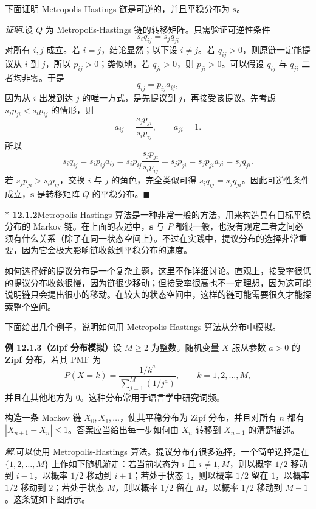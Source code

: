 \documentclass[UTF8,12pt,a4paper,fontset=fandol]{ctexart}
\newcommand{\biohazard}{\ensuremath{\ast}}
\begin{document}
下面证明 Metropolis-Hastings 链是可逆的，并且平稳分布为 $\mathbf s$。

\noindent\textit{证明.}\quad 设 $Q$ 为 Metropolis-Hastings 链的转移矩阵。只需验证可逆性条件
\[
  s_iq_{ij}=s_jq_{ji}
\]
对所有 $i,j$ 成立。若 $i=j$，结论显然；以下设 $i\ne j$。若 $q_{ij}>0$，则原链一定能提议从 $i$ 到 $j$，所以 $p_{ij}>0$；类似地，若 $q_{ji}>0$，则 $p_{ji}>0$。可以假设 $q_{ij}$ 与 $q_{ji}$ 二者均非零。于是
\[
  q_{ij}=p_{ij}a_{ij},
\]
因为从 $i$ 出发到达 $j$ 的唯一方式，是先提议到 $j$，再接受该提议。先考虑 $s_jp_{ji}<s_ip_{ij}$ 的情形，则
\[
  a_{ij}=\frac{s_jp_{ji}}{s_ip_{ij}},\qquad a_{ji}=1.
\]
所以
\[
  s_iq_{ij}
  =s_ip_{ij}a_{ij}
  =s_ip_{ij}\frac{s_jp_{ji}}{s_ip_{ij}}
  =s_jp_{ji}
  =s_jp_{ji}a_{ji}
  =s_jq_{ji}.
\]
若 $s_jp_{ji}>s_ip_{ij}$，交换 $i$ 与 $j$ 的角色，完全类似可得 $s_iq_{ij}=s_jq_{ji}$。因此可逆性条件成立，$\mathbf s$ 是转移矩阵 $Q$ 的平稳分布。$\blacksquare$

\noindent\textbf{$\biohazard$ 12.1.2}\quad Metropolis-Hastings 算法是一种非常一般的方法，用来构造具有目标平稳分布的 Markov 链。在上面的表述中，$\mathbf s$ 与 $P$ 都很一般，也没有规定二者之间必须有什么关系（除了在同一状态空间上）。不过在实践中，提议分布的选择非常重要，因为它会极大影响链收敛到平稳分布的速度。

如何选择好的提议分布是一个复杂主题，这里不作详细讨论。直观上，接受率很低的提议分布收敛很慢，因为链很少移动；但接受率很高也不一定理想，因为这可能说明链只会提出很小的移动。在较大的状态空间中，这样的链可能需要很久才能探索整个空间。

下面给出几个例子，说明如何用 Metropolis-Hastings 算法从分布中模拟。

\noindent\textbf{例 12.1.3（Zipf 分布模拟）}\quad 设 $M\ge2$ 为整数。随机变量 $X$ 服从参数 $a>0$ 的 \textbf{Zipf 分布}，若其 PMF 为
\[
  P(X=k)=\frac{1/k^a}{\sum_{j=1}^{M}(1/j^a)},
  \qquad k=1,2,\ldots,M,
\]
并且在其他地方为 $0$。这种分布常用于语言学中研究词频。

构造一条 Markov 链 $X_0,X_1,\ldots$，使其平稳分布为 Zipf 分布，并且对所有 $n$ 都有 $|X_{n+1}-X_n|\le1$。答案应当给出每一步如何由 $X_n$ 转移到 $X_{n+1}$ 的清楚描述。

\noindent\textit{解.}\quad 可以使用 Metropolis-Hastings 算法。提议分布有很多选择，一个简单选择是在 $\{1,2,\ldots,M\}$ 上作如下随机游走：若当前状态为 $i$ 且 $i\ne1,M$，则以概率 $1/2$ 移动到 $i-1$，以概率 $1/2$ 移动到 $i+1$；若处于状态 $1$，则以概率 $1/2$ 留在 $1$，以概率 $1/2$ 移动到 $2$；若处于状态 $M$，则以概率 $1/2$ 留在 $M$，以概率 $1/2$ 移动到 $M-1$。这条链如下图所示。
\end{document}
